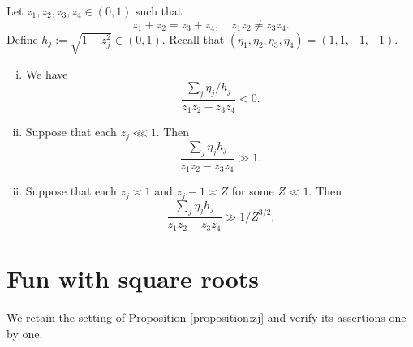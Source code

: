 \documentclass[reqno]{amsart} 
\begin{document}
\begin{proposition}\label{proposition:zj}
  Let $z_1,z_2,z_3,z_4 \in (0,1)$ such that
  \begin{equation*}
    z_1 + z_2 = z_3 + z_4, \quad z_1 z_2 \neq z_3 z_4.
  \end{equation*}  
  Define $h_j := \sqrt{1 - z_j^2} \in (0,1)$.  Recall that $(\eta_1,\eta_2,\eta_3,\eta_4) = (1,1,-1,-1)$.
  \begin{enumerate}[(i)]
  \item We have
    \begin{equation}\label{eqn:eta-sign}
      \frac{\sum _j \eta _j / h _j }{ z _1 z _2 - z_3 z_4 } < 0.
    \end{equation}
  \item Suppose that each $z_j \lll 1$.  Then
    \begin{equation}\label{eqn:eta-lower-1}
      \frac{\sum _j \eta _j h _j }{ z _1 z _2  - z _3 z _4 } \gg 1.
    \end{equation}
  \item Suppose that each $z_j \asymp 1$ and $z_j - 1 \asymp Z$ for some $Z \ll 1$.  Then
    \begin{equation}\label{eqn:eta-lower-2}
      \frac{\sum _j \eta _j h _j }{ z _1 z _2  - z _3 z _4 } \gg 1/Z^{3/2}.
    \end{equation}
  \end{enumerate}
\end{proposition}


\section{Fun with square roots}
We retain the setting of Proposition \ref{proposition:zj} and verify its assertions one by one.
\end{document}
